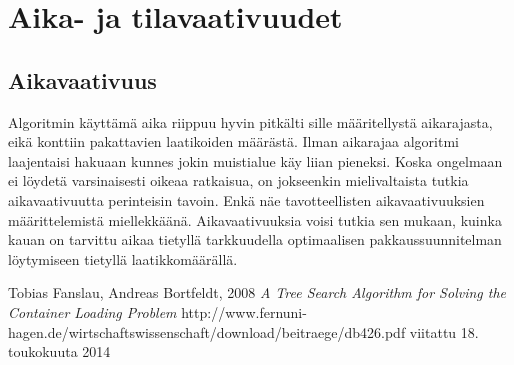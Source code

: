 \documentclass[a4paper,12pt, titlepage]{article}
\begin{document}
\section*{Aika- ja tilavaativuudet}
\subsection*{Aikavaativuus}
Algoritmin käyttämä aika riippuu hyvin pitkälti sille määritellystä aikarajasta, eikä konttiin pakattavien laatikoiden määrästä. Ilman aikarajaa algoritmi laajentaisi hakuaan kunnes jokin muistialue käy liian pieneksi. Koska ongelmaan ei löydetä varsinaisesti oikeaa ratkaisua, on jokseenkin mielivaltaista tutkia aikavaativuutta perinteisin tavoin. Enkä näe tavotteellisten aikavaativuuksien määrittelemistä miellekkäänä. Aikavaativuuksia voisi tutkia sen mukaan, kuinka kauan on tarvittu aikaa tietyllä tarkkuudella optimaalisen pakkaussuunnitelman löytymiseen tietyllä laatikkomäärällä. 

\begin{thebibliography}{9}

  Tobias Fanslau, Andreas Bortfeldt, 2008 \newline
  \emph{A Tree Search Algorithm for Solving the Container Loading Problem }\newline
  http://www.fernuni-hagen.de/wirtschaftswissenschaft/download/beitraege/db426.pdf\newline
  viitattu 18. toukokuuta 2014

\end{thebibliography}
\end{document}
